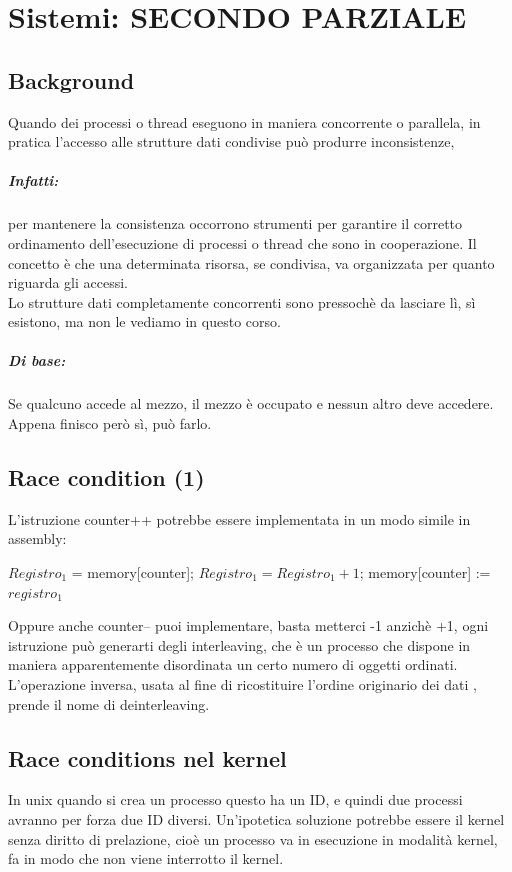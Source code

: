 \documentclass[12pt, a4paper, openany, twoside]{book}
\begin{document}
\chapter{Sistemi: SECONDO PARZIALE}
\section{Background}
Quando dei processi o thread eseguono in maniera concorrente o parallela, in 
pratica l'accesso alle strutture dati condivise può produrre inconsistenze,
\paragraph{Infatti:} per mantenere la consistenza occorrono strumenti per garantire il 
corretto ordinamento dell'esecuzione di processi o thread che sono in 
cooperazione. Il concetto è che una determinata risorsa, se condivisa, va 
organizzata per quanto riguarda gli accessi. \\
Lo strutture dati completamente concorrenti sono pressochè da lasciare lì, 
sì esistono, ma non le vediamo in questo corso. \\
\paragraph{Di base: }Se qualcuno accede al mezzo, il mezzo è occupato e nessun
altro deve accedere. Appena finisco però sì, può farlo.
\section{Race condition (1)}
L'istruzione counter++ potrebbe essere implementata in un modo simile in assembly:\\
\begin{center}
	$Registro_{1}$ = memory[counter];
	$Registro_{1} = Registro_{1} + 1$;
	memory[counter] := $registro_{1}$
\end{center}
Oppure anche counter-- puoi implementare, basta metterci -1 anzichè +1, 
ogni istruzione può generarti degli interleaving, che è un processo che dispone 
in maniera apparentemente disordinata un certo numero di oggetti ordinati. 
L'operazione inversa, usata al fine di ricostituire l'ordine originario dei dati
, prende il nome di deinterleaving. 
\section{Race conditions nel kernel}
In unix quando si crea un processo questo ha un ID, e quindi due processi 
avranno per forza due ID diversi. Un'ipotetica soluzione potrebbe essere 
il kernel senza diritto di prelazione, cioè un processo va in esecuzione in 
modalità kernel, fa in modo che non viene interrotto il kernel. 
\end{document}
